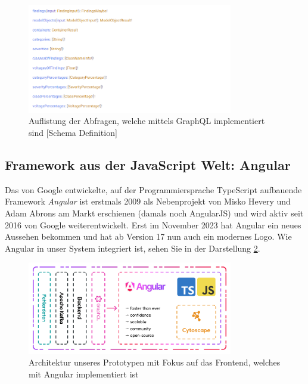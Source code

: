 \begin{figure}
    \centering
    \includegraphics[width=0.8\textwidth]{content/img/Empire/Frontend/Queries.png}
    \caption{Auflistung der Abfragen, welche mittels GraphQL implementiert sind [Schema Definition]}
    \label{fig:GraphQLQueries}
\end{figure}
\FloatBarrier

\subsection{Framework aus der JavaScript Welt: Angular}

Das von Google entwickelte, auf der Programmiersprache TypeScript aufbauende Framework \emph{Angular} ist erstmals 2009 als Nebenprojekt von Misko Hevery und Adam Abrons am Markt erschienen (damals noch AngularJS) und wird aktiv seit 2016 von Google weiterentwickelt. Erst im November 2023 hat Angular ein neues Aussehen bekommen und hat ab Version 17 nun auch ein modernes Logo. Wie Angular in unser System integriert ist, sehen Sie in der Darstellung \ref{fig:ArchitectureFrontendAngular}. \cite{FireshipAngular}

\begin{figure}
    \centering
    \includegraphics[width=0.8\textwidth]{content/img/Architecture/Architecture_Angular.jpg}
    \caption{Architektur unseres Prototypen mit Fokus auf das Frontend, welches mit Angular implementiert ist}
    \label{fig:ArchitectureFrontendAngular}
\end{figure}
\FloatBarrier

